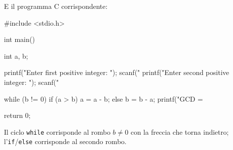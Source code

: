 \documentclass[11pt,a4paper]{article}
\begin{document}
E il programma C corrispondente:
\begin{codice}
#include <stdio.h>

int main() {
    int a, b;

    printf("Enter first positive integer: \n");
    scanf("%
    printf("Enter second positive integer: \n");
    scanf("%

    while (b != 0) {
        if (a > b)
            a = a - b;
        else
            b = b - a;
    }
    printf("GCD = %

    return 0;
}
\end{codice}

\begin{osservazione}
Il ciclo \lstinline|while| corrisponde al rombo $b \neq 0$ con la freccia che
torna indietro; l'\lstinline|if|/\lstinline|else| corrisponde al secondo rombo.
\end{osservazione}
\end{document}
